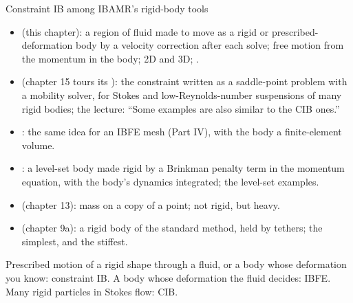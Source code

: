 \documentclass[aspectratio=169,11pt]{beamer}
\begin{document}
\begin{frame}{Constraint IB among IBAMR's rigid-body tools}
\label{fr:tools}
\footnotesize
\begin{itemize}
  \item {} (this chapter): a region of fluid made to move as a rigid or prescribed-deformation body by a velocity correction after each solve; free motion from the momentum in the body; 2D and 3D; .
  \item {} (chapter 15 tours its ): the constraint written as a saddle-point problem with a mobility solver, for Stokes and low-Reynolds-number suspensions of many rigid bodies; the lecture: ``Some examples are also similar to the CIB ones.''
  \item {}: the same idea for an IBFE mesh (Part IV), with the body a finite-element volume.
  \item {}: a level-set body made rigid by a Brinkman penalty term in the momentum equation, with the body's dynamics integrated; the level-set examples.
  \item {} (chapter 13): mass on a copy of a point; not rigid, but heavy.
  \item {} (chapter 9a): a rigid body of the standard method, held by tethers; the simplest, and the stiffest.
\end{itemize}
\begin{punchbox}
\footnotesize Prescribed motion of a rigid shape through a fluid, or a body whose deformation you know: constraint IB. A body whose deformation the fluid decides: IBFE. Many rigid particles in Stokes flow: CIB.
\end{punchbox}
\end{frame}
\end{document}
